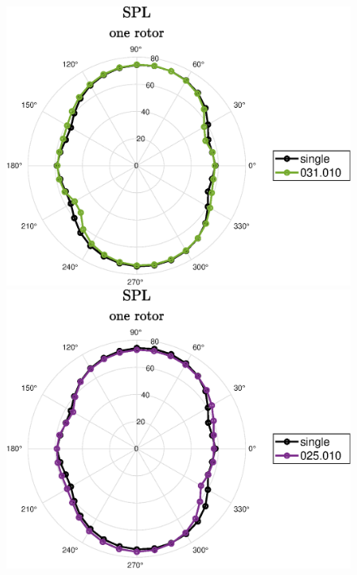 \begin{frame}{\subsecname}
    \begin{figure} [H]  
	\centering
	\subfloat
	{\includegraphics[scale=0.35]{Photos/spl_1rot_031010_single.eps}}
	\subfloat
	{\includegraphics[scale=0.35]{Photos/spl_1rot_025010_single.eps}}
\end{figure} 
\end{frame}

